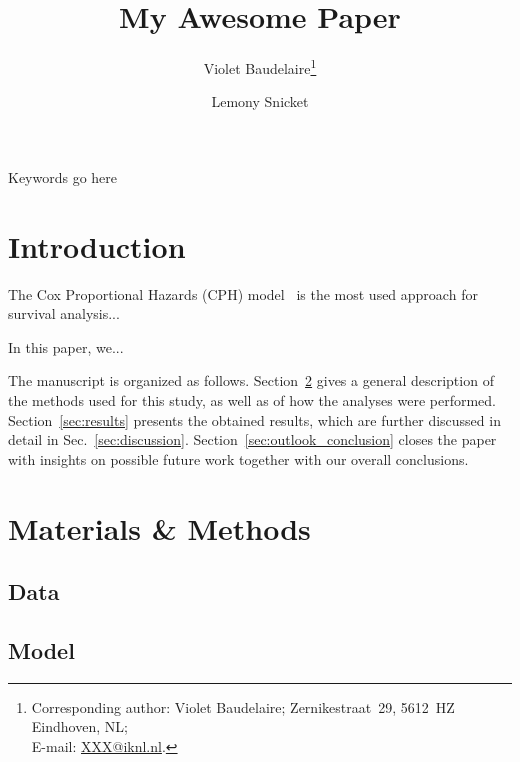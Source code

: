 \documentclass{scrartcl}
\begin{document}
\title{My Awesome Paper}
\author[a]{Violet Baudelaire\thanks{Corresponding author: Violet Baudelaire; Zernikestraat~29, 5612~HZ Eindhoven, NL; \\E-mail: \href{mailto:XXX@iknl.nl}{XXX@iknl.nl}.}}
\author[b]{Lemony Snicket}
\maketitle


\begin{keywords}
Keywords go here
\end{keywords}

\newpage
\section{Introduction}\label{sec:introduction}
The Cox Proportional Hazards (CPH) model~\cite{cox1972regression} is the most used approach for survival analysis...

In this paper, we...

The manuscript is organized as follows. Section~\ref{sec:materials_methods} gives a general description of the methods used for this study, as well as of how the analyses were performed. Section~\ref{sec:results} presents the obtained results, which are further discussed in detail in Sec.~\ref{sec:discussion}. Section~\ref{sec:outlook_conclusion} closes the paper with insights on possible future work together with our overall conclusions.


\newpage
\section{Materials \& Methods}\label{sec:materials_methods}

\subsection{Data}

\subsection{Model}
\end{document}
